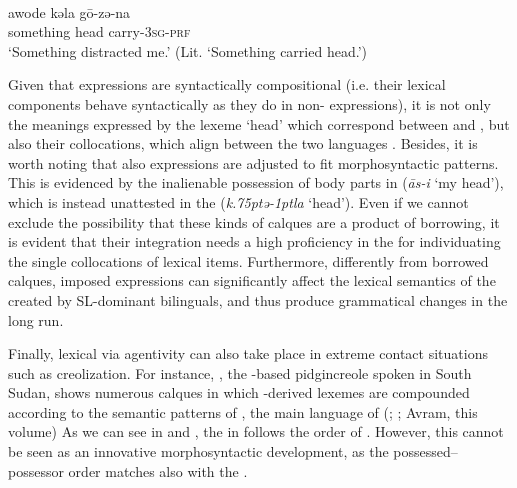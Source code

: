 \documentclass[output=paper]{langsci/langscibook}
\begin{document}
\\
\gll   awode kǝla   gō-zǝ-na \\
       something head carry-\textsc{3sg-prf}\\
\glt   `Something distracted me.' (Lit. ‘Something carried head.’)
\z
\z

Given that  expressions are syntactically compositional (i.e. their lexical components behave syntactically as they do in non- expressions), it is not only the meanings expressed by the lexeme ‘head’ which correspond between   and , but also their  collocations, which align between the two languages \citep[157]{Owens2014}. Besides, it is worth noting that also  expressions are adjusted to fit  morphosyntactic patterns. This is evidenced by the inalienable possession of body parts in   (\textit{{\R}ās-i} ‘my head’), which is instead unattested in the  (\textit{k\kern .75ptǝ\kern -1ptla} ‘head’). Even if we cannot exclude the possibility that these kinds of calques are a product of borrowing, it is evident that their integration needs a high proficiency in the  for individuating the single  collocations of lexical items. Furthermore, differently from borrowed calques, imposed  expressions can significantly affect the lexical semantics of the  created by SL-dominant bilinguals, and thus produce grammatical changes in the long run. 

Finally, lexical  via  agentivity can also take place in extreme contact situations such as creolization. For instance,  , the -based pidgincreole spoken in South Sudan, shows numerous calques in which -derived lexemes are compounded according to the semantic patterns of , the main  language of   (\citealt{Nakao2012}; \citealt[50]{Manfredi2017}; Avram, this volume) As we can see in  and , the  in    follows the order of  . However, this cannot be seen as an innovative morphosyntactic development, as the possessed–possessor order matches also with the  . 
\end{document}
